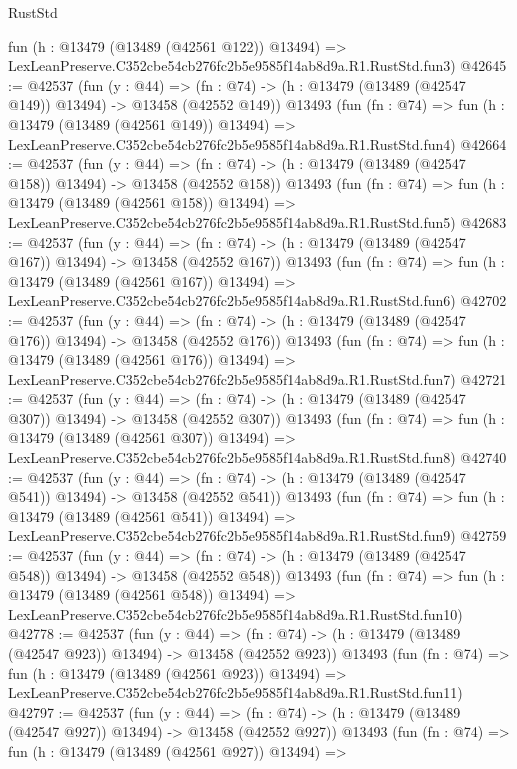 \begin{lexlean}{RustStd}
\begin{coremodule}
    fun (h : @13479 (@13489 (@42561 @122)) @13494) =>
    LexLeanPreserve.C352cbe54cb276fc2b5e9585f14ab8d9a.R1.RustStd.fun3)
@42645 := @42537
    (fun (y : @44) =>
    (fn : @74) -> (h : @13479 (@13489 (@42547 @149)) @13494) -> @13458 (@42552 @149))
    @13493
    (fun (fn : @74) =>
    fun (h : @13479 (@13489 (@42561 @149)) @13494) =>
    LexLeanPreserve.C352cbe54cb276fc2b5e9585f14ab8d9a.R1.RustStd.fun4)
@42664 := @42537
    (fun (y : @44) =>
    (fn : @74) -> (h : @13479 (@13489 (@42547 @158)) @13494) -> @13458 (@42552 @158))
    @13493
    (fun (fn : @74) =>
    fun (h : @13479 (@13489 (@42561 @158)) @13494) =>
    LexLeanPreserve.C352cbe54cb276fc2b5e9585f14ab8d9a.R1.RustStd.fun5)
@42683 := @42537
    (fun (y : @44) =>
    (fn : @74) -> (h : @13479 (@13489 (@42547 @167)) @13494) -> @13458 (@42552 @167))
    @13493
    (fun (fn : @74) =>
    fun (h : @13479 (@13489 (@42561 @167)) @13494) =>
    LexLeanPreserve.C352cbe54cb276fc2b5e9585f14ab8d9a.R1.RustStd.fun6)
@42702 := @42537
    (fun (y : @44) =>
    (fn : @74) -> (h : @13479 (@13489 (@42547 @176)) @13494) -> @13458 (@42552 @176))
    @13493
    (fun (fn : @74) =>
    fun (h : @13479 (@13489 (@42561 @176)) @13494) =>
    LexLeanPreserve.C352cbe54cb276fc2b5e9585f14ab8d9a.R1.RustStd.fun7)
@42721 := @42537
    (fun (y : @44) =>
    (fn : @74) -> (h : @13479 (@13489 (@42547 @307)) @13494) -> @13458 (@42552 @307))
    @13493
    (fun (fn : @74) =>
    fun (h : @13479 (@13489 (@42561 @307)) @13494) =>
    LexLeanPreserve.C352cbe54cb276fc2b5e9585f14ab8d9a.R1.RustStd.fun8)
@42740 := @42537
    (fun (y : @44) =>
    (fn : @74) -> (h : @13479 (@13489 (@42547 @541)) @13494) -> @13458 (@42552 @541))
    @13493
    (fun (fn : @74) =>
    fun (h : @13479 (@13489 (@42561 @541)) @13494) =>
    LexLeanPreserve.C352cbe54cb276fc2b5e9585f14ab8d9a.R1.RustStd.fun9)
@42759 := @42537
    (fun (y : @44) =>
    (fn : @74) -> (h : @13479 (@13489 (@42547 @548)) @13494) -> @13458 (@42552 @548))
    @13493
    (fun (fn : @74) =>
    fun (h : @13479 (@13489 (@42561 @548)) @13494) =>
    LexLeanPreserve.C352cbe54cb276fc2b5e9585f14ab8d9a.R1.RustStd.fun10)
@42778 := @42537
    (fun (y : @44) =>
    (fn : @74) -> (h : @13479 (@13489 (@42547 @923)) @13494) -> @13458 (@42552 @923))
    @13493
    (fun (fn : @74) =>
    fun (h : @13479 (@13489 (@42561 @923)) @13494) =>
    LexLeanPreserve.C352cbe54cb276fc2b5e9585f14ab8d9a.R1.RustStd.fun11)
@42797 := @42537
    (fun (y : @44) =>
    (fn : @74) -> (h : @13479 (@13489 (@42547 @927)) @13494) -> @13458 (@42552 @927))
    @13493
    (fun (fn : @74) =>
    fun (h : @13479 (@13489 (@42561 @927)) @13494) =>

\end{coremodule}
\end{lexlean}
